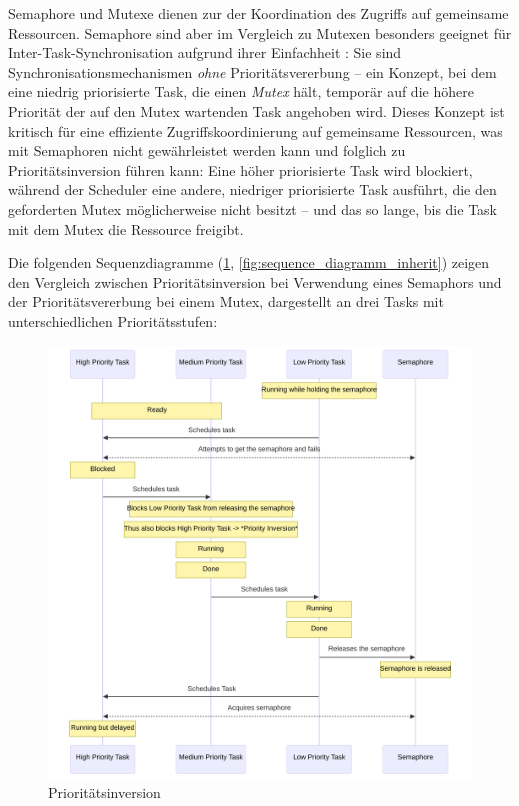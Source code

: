 Semaphore und Mutexe dienen zur der Koordination des Zugriffs auf gemeinsame
Ressourcen. Semaphore sind aber im Vergleich zu Mutexen besonders geeignet für
Inter-Task-Synchronisation aufgrund ihrer Einfachheit
\cite{freertos_semphr_doc}: Sie sind Synchronisationsmechanismen \textit{ohne}
Prioritätsvererbung -- ein Konzept, bei dem eine niedrig priorisierte Task, die
einen \textit{Mutex} hält, temporär auf die höhere Priorität der auf den Mutex
wartenden Task angehoben wird. Dieses Konzept ist kritisch für eine effiziente
Zugriffskoordinierung auf gemeinsame Ressourcen, was mit Semaphoren nicht
gewährleistet werden kann und folglich zu Prioritätsinversion führen kann: Eine
höher priorisierte Task wird blockiert, während der Scheduler eine andere,
niedriger priorisierte Task ausführt, die den geforderten Mutex möglicherweise
nicht besitzt -- und das so lange, bis die Task mit dem Mutex die Ressource
freigibt.

Die folgenden Sequenzdiagramme (\ref{fig:sequence_diagramm_invert},
\ref{fig:sequence_diagramm_inherit}) zeigen den Vergleich zwischen
Prioritätsinversion bei Verwendung eines Semaphors und der Prioritätsvererbung
bei einem Mutex, dargestellt an drei Tasks mit unterschiedlichen
Prioritätsstufen:

\begin{figure}[H]
    \centering
    \includegraphics[width=1\textwidth]{assets/prio_inversion}
    \caption{Prioritätsinversion}
    \label{fig:sequence_diagramm_invert}
\end{figure}

